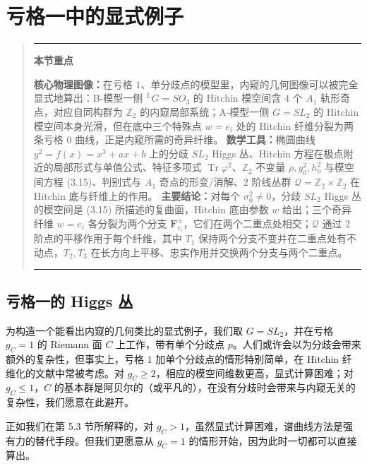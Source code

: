 \documentclass[11pt,a4paper]{article}
\newenvironment{keytakeaway}
  {\par\medskip\begin{quote}\small\noindent
   \rule{\linewidth}{0.6pt}\par\nopagebreak\smallskip\noindent
   \textbf{本节重点}\par\nobreak\smallskip\noindent\ignorespaces}
  {\par\smallskip\noindent\rule{\linewidth}{0.6pt}\end{quote}\medskip}
\begin{document}

\section{亏格一中的显式例子}

\begin{keytakeaway}
\textbf{核心物理图像：}在亏格 $1$、单分歧点的模型里，内窥的几何图像可以被完全显式地算出：B-模型一侧 ${}^{L}G=SO_3$ 的 Hitchin 模空间含 $4$ 个 $A_1$ 轨形奇点，对应自同构群为 $\mathbb{Z}_2$ 的内窥局部系统；A-模型一侧 $G=SL_2$ 的 Hitchin 模空间本身光滑，但在底中三个特殊点 $w=e_i$ 处的 Hitchin 纤维分裂为两条亏格 $0$ 曲线，正是内窥所需的奇异纤维。
\textbf{数学工具：}椭圆曲线 $y^2=f(x)=x^3+ax+b$ 上的分歧 $SL_2$ Higgs 丛、Hitchin 方程在极点附近的局部形式与单值公式、特征多项式 $\operatorname{Tr}\varphi^2$、$\mathbb{Z}_2$ 不变量 $\rho,y_0^2,h_0^2$ 与模空间方程 (3.15)、判别式与 $A_1$ 奇点的形变/消解、2 阶线丛群 $\mathcal{Q}=\mathbb{Z}_2\times\mathbb{Z}_2$ 在 Hitchin 底与纤维上的作用。
\textbf{主要结论：}对每个 $\sigma_0^2\neq 0$，分歧 $SL_2$ Higgs 丛的模空间是 (3.15) 所描述的复曲面，Hitchin 底由参数 $w$ 给出；三个奇异纤维 $w=e_i$ 各分裂为两个分支 $\boldsymbol{F}_{e_i}^{\pm}$，它们在两个二重点处相交；$\mathcal{Q}$ 通过 2 阶点的平移作用于每个纤维，其中 $T_1$ 保持两个分支不变并在二重点处有不动点，$T_2,T_3$ 在长方向上平移、忠实作用并交换两个分支与两个二重点。
\end{keytakeaway}

\subsection{亏格一的 Higgs 丛}

为构造一个能看出内窥的几何类比的显式例子，我们取 $G=SL_2$，并在亏格 $g_C=1$ 的 Riemann 面 $C$ 上工作，带有单个分歧点 $p$。人们或许会以为分歧会带来额外的复杂性，但事实上，亏格 $1$ 加单个分歧点的情形特别简单，在 Hitchin 纤维化的文献中常被考虑。对 $g_C\ge 2$，相应的模空间维数更高，显式计算困难；对 $g_C\le 1$，$C$ 的基本群是阿贝尔的（或平凡的），在没有分歧时会带来与内窥无关的复杂性，我们愿意在此避开。

正如我们在第 5.3 节所解释的，对 $g_C>1$，虽然显式计算困难，谱曲线方法是强有力的替代手段。但我们更愿意从 $g_C=1$ 的情形开始，因为此时一切都可以直接算出。
\end{document}
